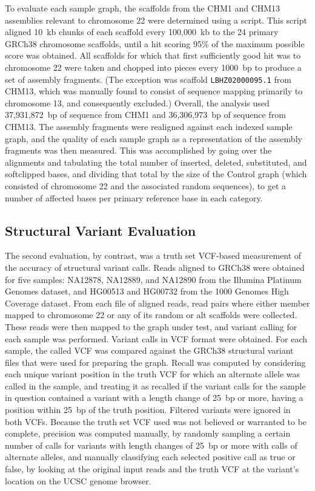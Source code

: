 To evaluate each sample graph, the scaffolds from the CHM1 and CHM13 assemblies relevant to chromosome 22 were determined using a script. This script aligned 10~kb chunks of each scaffold every 100,000~kb to the 24 primary GRCh38 chromosome scaffolds, until a hit scoring 95\% of the maximum possible score was obtained. All scaffolds for which that first sufficiently good hit was to chromosome 22 were taken and chopped into pieces every 1000~bp to produce a set of assembly fragments. (The exception was scaffold \texttt{LBHZ02000095.1} from CHM13, which was manually found to consist of sequence mapping primarily to chromosome 13, and consequently excluded.) Overall, the analysis used 37,931,872~bp of sequence from CHM1 and 36,306,973~bp of sequence from CHM13. The assembly fragments were realigned against each indexed sample graph, and the quality of each sample graph as a representation of the assembly fragments was then measured. This was accomplished by going over the alignments and tabulating the total number of inserted, deleted, substituted, and softclipped bases, and dividing that total by the size of the Control graph (which consisted of chromosome 22 and the associated random sequences), to get a number of affected bases per primary reference base in each category.

\subsection{Structural Variant Evaluation}
\label{subsec:structuralvariantevaluation}

The second evaluation, by contrast, was a truth set VCF-based measurement of the accuracy of structural variant calls. Reads aligned to GRCh38 were obtained for five samples: NA12878, NA12889, and NA12890 from the Illumina Platinum Genomes dataset, and HG00513 and HG00732 from the 1000 Genomes High Coverage dataset. From each file of aligned reads, read pairs where either member mapped to chromosome 22 or any of its random or alt scaffolds were collected. These reads were then mapped to the graph under test, and variant calling for each sample was performed. Variant calls in VCF format were obtained. For each sample, the called VCF was compared against the GRCh38 structural variant files that were used for preparing the graph. Recall was computed by considering each unique variant position in the truth VCF for which an alternate allele was called in the sample, and treating it as recalled if the variant calls for the sample in question contained a variant with a length change of 25~bp or more, having a position within 25~bp of the truth position. Filtered variants were ignored in both VCFs. Because the truth set VCF used was not believed or warranted to be complete, precision was computed manually, by randomly sampling a certain number of calls for variants with length changes of 25~bp or more with calls of alternate alleles, and manually classifying each selected positive call as true or false, by looking at the original input reads and the truth VCF at the variant's location on the UCSC genome browser.

